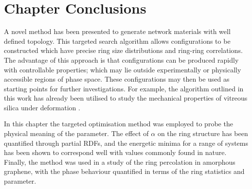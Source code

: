 \section{Chapter Conclusions}

A novel method has been presented to generate \td{} network materials with well defined topology. 
This targeted \mc{} search algorithm allows configurations to be constructed which have precise ring size distributions and ring\--ring correlations.
The advantage of this approach is that configurations can be produced rapidly with controllable properties; which may lie outside experimentally or physically accessible regions of phase space.
These configurations may then be used as starting points for further investigations.
For example, the algorithm outlined in this work has already been utilised to study the mechanical properties of vitreous silica under deformation \cite{Bamer2020,Ebrahem2020a}.

In this chapter the targeted optimisation method was employed to probe the physical meaning of the \aw{} parameter.
The effect of $\alpha$ on the ring structure has been quantified through partial RDFs, and the energetic minima for a range of systems has been shown to correspond well with values commonly found in nature.
Finally, the method was used in a study of the ring percolation in amorphous graphene, with the phase behaviour quantified in terms of the ring statistics and \aw{} parameter.

 





